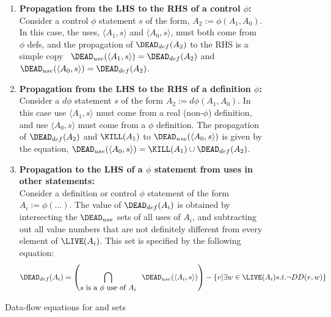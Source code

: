 \begin{figure}
\begin{enumerate}
\item {\bf Propagation from the LHS to the RHS of a control $\phi$:}\\
Consider a control $\phi$ statement $s$ of the form, $A_2  := \phi(A_1,A_0)$.
In this case, the 
uses, $\langle A_1, s \rangle$ and $\langle A_0, s \rangle$, must both come from $\phi$ defs, and 
the propagation of $\DEAD_{def}(A_2)$ to the RHS is a simple copy
\ie\
$\DEAD_{use}(\langle A_1,s \rangle) = \DEAD_{def}(A_2)$ and
$\DEAD_{use}(\langle A_0,s \rangle) = \DEAD_{def}(A_2)$.

\item {\bf Propagation from the LHS to the RHS of a definition $\phi$:}\\
Consider a $d\phi$ statement $s$ of the form $A_2 := d\phi(A_1, A_0)$.
In this case use
$\langle A_1,s \rangle$ must come from a real (non-$\phi$) definition, and use $\langle A_0,s \rangle$  must
come from a $\phi$ definition.  The propagation
of $\DEAD_{def}(A_2)$ and $\KILL(A_1)$ to
$\DEAD_{use}(\langle A_0,s \rangle)$ is given by the equation,
$
\DEAD_{use}(\langle A_0,s \rangle) = \KILL(A_1) \cup \DEAD_{def}(A_2)
$.

\item {\bf Propagation to the LHS of a $\phi$ statement from uses
in other statements:}\\
Consider a definition or control $\phi$ statement of the form $A_i := \phi(\ldots)$.  The value of $\DEAD_{def}(A_i)$ is obtained by intersecting
the $\DEAD_{use}$
sets of all uses of
$A_i$, and subtracting out all value numbers that are not definitely different 
from every element of $\LIVE(A_i)$. 
This set is specified by the following equation:
$$
\DEAD_{def}(A_i) = \left(\bigcap_{\mbox{$s$ is a $\phi$ use of $A_i$}} \;\; \DEAD_{use}(\langle A_i,s \rangle)
\right) - \{ v | \exists w \in \LIVE(A_i) s.t. \neg DD(v,w) \}
$$
\end{enumerate}
\caption{Data-flow equations for  and 
 sets}
\label{fig:dead}
\end{figure}


